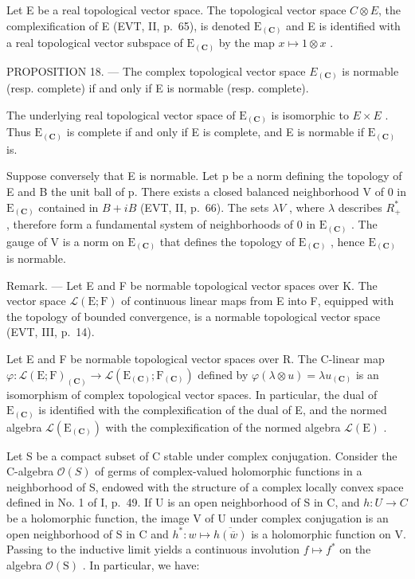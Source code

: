 Let E be a real topological vector space. The topological vector space \(C \otimes E\), the complexification of E (EVT, II, p.~65), is denoted \(\mathrm{E}_{(\mathbf{C})}\) and E is identified with a real topological vector subspace of \(\mathrm{E}_{(\mathbf{C})}\) by the map \(x \mapsto 1 \otimes x\) .

PROPOSITION 18. --- The complex topological vector space \(E_{(\mathbf{C})}\) is normable (resp. complete) if and only if E is normable (resp. complete).

The underlying real topological vector space of \(\mathrm{E}_{(\mathbf{C})}\) is isomorphic to \(E \times E\) . Thus \(\mathrm{E}_{(\mathbf{C})}\) is complete if and only if E is complete, and E is normable if \(\mathrm{E}_{(\mathbf{C})}\) is.

Suppose conversely that E is normable. Let p be a norm defining the topology of E and B the unit ball of p. There exists a closed balanced neighborhood V of 0 in \(\mathrm{E}_{(\mathbf{C})}\) contained in \(B+iB\) (EVT, II, p.~66). The sets \(\lambda V\) , where \(\lambda\) describes \(R_{+}^{*}\) , therefore form a fundamental system of neighborhoods of 0 in \(\mathrm{E}_{(\mathbf{C})}\) . The gauge of V is a norm on \(\mathrm{E}_{(\mathbf{C})}\) that defines the topology of \(\mathrm{E}_{(\mathbf{C})}\) , hence \(\mathrm{E}_{(\mathbf{C})}\) is normable.

Remark. --- Let E and F be normable topological vector spaces over K. The vector space \(\mathcal{L}(\mathrm{E};\mathrm{F})\) of continuous linear maps from E into F, equipped with the topology of bounded convergence, is a normable topological vector space (EVT, III, p.~14).

Let E and F be normable topological vector spaces over R. The C-linear map \(\varphi\colon\mathcal{L}(\mathrm{E};\mathrm{F})_{(\mathbf{C})}\to\mathcal{L}(\mathrm{E}_{(\mathbf{C})};\mathrm{F}_{(\mathbf{C})})\) defined by \(\varphi(\lambda\otimes u)=\lambda u_{(\mathbf{C})}\) is an isomorphism of complex topological vector spaces. In particular, the dual of \(\mathrm{E}_{(\mathbf{C})}\) is identified with the complexification of the dual of E, and the normed algebra \(\mathcal{L}(\mathrm{E}_{(\mathbf{C})})\) with the complexification of the normed algebra \(\mathcal{L}(\mathrm{E})\) .

Let S be a compact subset of C stable under complex conjugation. Consider the C-algebra \(\mathcal{O}(S)\) of germs of complex-valued holomorphic functions in a neighborhood of S, endowed with the structure of a complex locally convex space defined in No. 1 of I, p.~49. If U is an open neighborhood of S in C, and \(h: U \to C\) be a holomorphic function, the image V of U under complex conjugation is an open neighborhood of S in C and \(h^{*}: w \mapsto \overline{h(\overline{w})}\) is a holomorphic function on V. Passing to the inductive limit yields a continuous involution \(f\mapsto f^{*}\) on the algebra \(\mathcal{O}(\mathrm{S})\) . In particular, we have:

